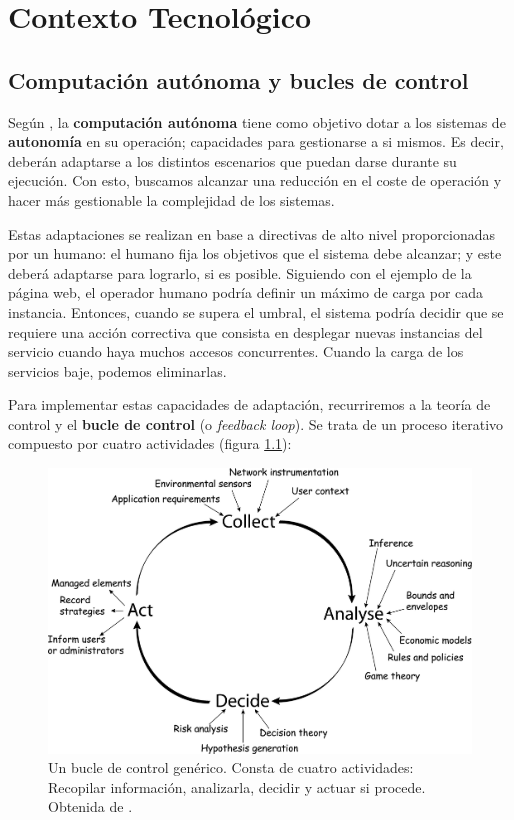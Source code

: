 \chapter{Contexto Tecnológico}
\label{chap:contexto_tecnologico}

\section{Computación autónoma y bucles de control}

Según \cite{ibmcorporationArchitecturalBlueprintAutonomic2006}, la \textbf{computación autónoma} tiene como objetivo dotar a los sistemas de \textbf{autonomía} en su operación; capacidades para gestionarse a si mismos. Es decir, deberán adaptarse a los distintos escenarios que puedan darse durante su ejecución. Con esto, buscamos alcanzar una reducción en el coste de operación y hacer más gestionable la complejidad de los sistemas.

Estas adaptaciones se realizan en base a directivas de alto nivel proporcionadas por un humano: el humano fija los objetivos que el sistema debe alcanzar; y este deberá adaptarse para lograrlo, si es posible. Siguiendo con el ejemplo de la página web, el operador humano podría definir un máximo de carga por cada instancia. Entonces, cuando se supera el umbral, el sistema podría decidir que se requiere una acción correctiva que consista en desplegar nuevas instancias del servicio cuando haya muchos accesos concurrentes. Cuando la carga de los servicios baje, podemos eliminarlas.

Para implementar estas capacidades de adaptación, recurriremos a la teoría de control y el \textbf{bucle de control} (o \emph{feedback loop}). \cite{brunEngineeringSelfAdaptiveSystems2009} Se trata de un proceso iterativo compuesto por cuatro actividades (figura \ref{fig:bucle-control}):

\begin{figure}[h]
  \centering
  \includegraphics[scale=0.065]{cap_introduccion/images/feedback-loop}
  \caption[Un bucle de control genérico. Consta de cuatro actividades: Recopilar información, analizarla, decidir y actuar si procede.]{Un bucle de control genérico. Consta de cuatro actividades: Recopilar información, analizarla, decidir y actuar si procede. Obtenida de \cite{dobsonSurveyAutonomicCommunications2006}.}
  \label{fig:bucle-control}
\end{figure}


